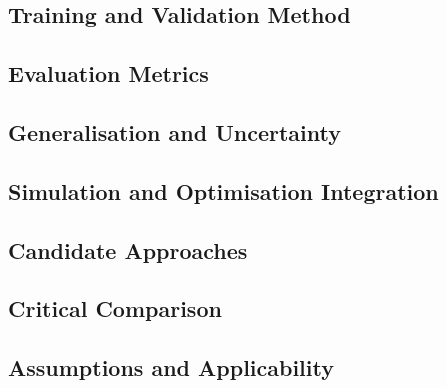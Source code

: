 
\subsection{Training and Validation Method}
\label{sec:res-ml-spec-training-validation-method}


\subsection{Evaluation Metrics}
\label{sec:res-ml-spec-evaluation-metrics}


\subsection{Generalisation and Uncertainty}
\label{sec:res-ml-spec-generalisation-uncertainty}


\subsection{Simulation and Optimisation Integration}
\label{sec:res-ml-spec-simulation-optimisation-integration}


\subsection{Candidate Approaches}
\label{sec:res-ml-spec-candidate-approaches}


\subsection{Critical Comparison}
\label{sec:res-ml-spec-critical-comparison}


\subsection{Assumptions and Applicability}
\label{sec:res-ml-spec-assumptions}

